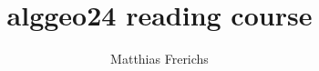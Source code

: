 \documentclass[
oneside
]{scrreprt}
\makeatletter
\newcommand{\DOCNAME}{alggeo24 reading course}
\renewcommand\maketitle
  {\noindent
   {\huge\bfseries\@title}%
   \medskip\par\noindent
   {\large\bfseries\@author}%
   \hfill
   {\large\@date}%
   \bigskip\par\noindent
  }
\makeatother
\begin{document}
\title{\DOCNAME}
\author{Matthias Frerichs}
\maketitle

\tableofcontents





\printbibliography
\end{document}
